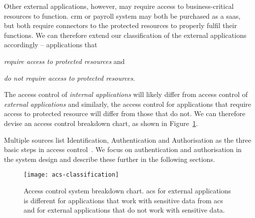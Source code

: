 Other external applications, however, may require access to business-critical resources to function. \acrlong{crm} or payroll system may both be purchased as a \acrshort{saas}, but both require connectors to the protected resources to properly fulfil their functions. We can therefore extend our classification of the external applications accordingly -- applications that
\begin{enumerate*}[label=(\roman*)]
    \item \textit{require access to protected resources} and
    \item \textit{do not require access to protected resources}.
\end{enumerate*}

The access control of \textit{internal applications} will likely differ from access control of \textit{external applications} and similarly, the access control for applications that require access to protected resource will differ from those that do not. We can therefore devise an access control breakdown chart, as shown in Figure~\ref{fig:acs-classification}. 

Multiple sources list Identification, Authentication and Authorisation as the three basic steps in access control~\cite{Harris2008CISSPGuide, 2018AccessSystems, 2003IdentificationAuthorization}. We focus on authentication and authorisation in the system design and describe these further in the following sections.

\begin{figure}[ht]
    \centering
    \texttt{[image: acs-classification]}
    \caption{Access control system breakdown chart. \acrshort{acs} for external applications is different for applications that work with sensitive data from \acrshort{acs} and for external applications that do not work with sensitive data.}
    \label{fig:acs-classification}
\end{figure}








\restoregeometry